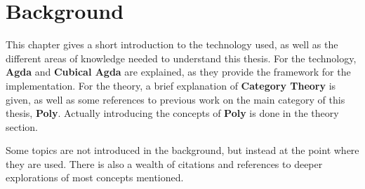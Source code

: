 \chapter{Background}\label{chapter:background}
This chapter gives a short introduction to the technology used, as well as the different areas of knowledge needed to understand this thesis. For the technology, \textbf{Agda} and \textbf{Cubical Agda} are explained, as they provide the framework for the implementation. For the theory, a brief explanation of \textbf{Category Theory} is given, as well as some references to previous work on the main category of this thesis, \textbf{Poly}. Actually introducing the concepts of \textbf{Poly} is done in the theory section.

Some topics are not introduced in the background, but instead at the point where they are used. There is also a wealth of citations and references to deeper explorations of most concepts mentioned.







